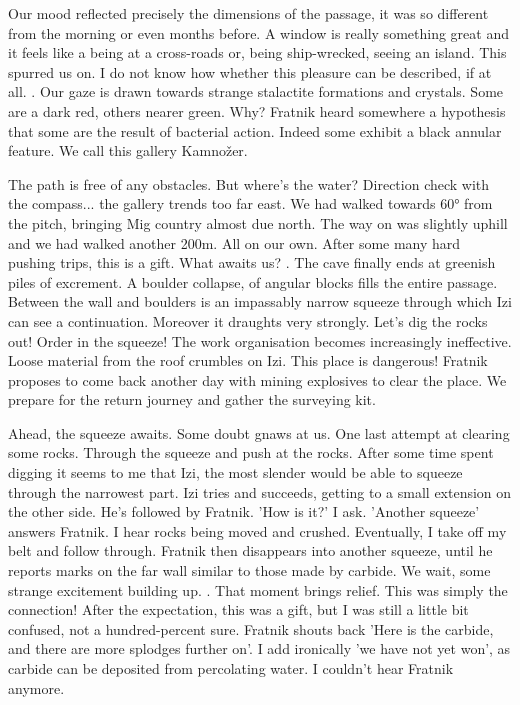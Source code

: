 Our mood reflected precisely the dimensions of the passage, it was so different from the morning or even months before. A window is really something great and it feels like a being at a cross-roads or, being ship-wrecked, seeing an island. This spurred us on. I do not know how whether this pleasure can be described, if at all. . Our gaze is drawn towards strange stalactite formations and crystals. Some are a dark red, others nearer green. Why? Fratnik heard somewhere a hypothesis that some are the result of bacterial action. Indeed some exhibit a black annular feature. We call this gallery Kamnožer. 

The path is free of any obstacles. But where's the water? Direction check with the compass... the gallery trends too far east. We had walked towards 60° from the pitch, bringing Mig country almost due north. The way on was slightly uphill and we had walked another 200m. All on our own. After some many hard pushing trips, this is a gift. What awaits us? . The cave finally ends at greenish piles of excrement. A boulder collapse, of angular blocks fills the entire passage. Between the wall and boulders is an impassably narrow squeeze through which Izi can see a continuation. Moreover it draughts very strongly. Let's dig the rocks out! Order in the squeeze! The work organisation becomes increasingly ineffective. Loose material from the roof crumbles on Izi. This place is dangerous! Fratnik proposes to come back another day with mining explosives to clear the place. We prepare for the return journey and gather the surveying kit. 

Ahead, the squeeze awaits. Some doubt gnaws at us. One last attempt at clearing some rocks. Through the squeeze and push at the rocks. After some time spent digging it seems to me that Izi, the most slender would be able to squeeze through the narrowest part. Izi tries and succeeds, getting to a small extension on the other side. He's followed by Fratnik. 'How is it?' I ask. 'Another squeeze' answers Fratnik. I hear rocks being moved and crushed. Eventually, I take off my belt and follow through. Fratnik then disappears into another squeeze, until he reports marks on the far wall similar to those made by carbide. We wait, some strange excitement building up. . That moment brings relief. This was simply the connection! After the expectation, this was a gift, but I was still a little bit confused, not a hundred-percent sure. Fratnik shouts back 'Here is the carbide, and there are more splodges further on'. I add ironically 'we have not yet won', as carbide can be deposited from percolating water. I couldn't hear Fratnik anymore.

